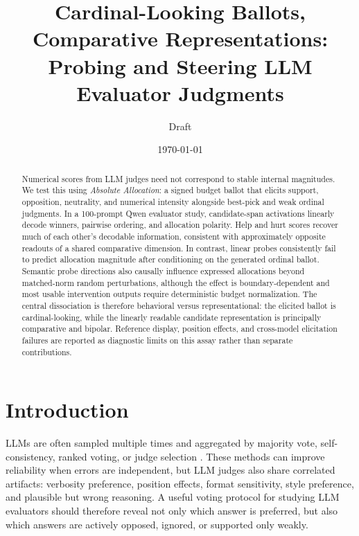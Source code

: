 \documentclass[11pt]{article}
\title{Cardinal-Looking Ballots, Comparative Representations: Probing and Steering LLM Evaluator Judgments}
\author{Draft}
\date{\today}
\begin{document}
\maketitle

\begin{abstract}
Numerical scores from LLM judges need not correspond to stable internal
magnitudes. We test this using \emph{Absolute Allocation}: a signed budget
ballot that elicits support, opposition, neutrality, and numerical intensity
alongside best-pick and weak ordinal judgments. In a 100-prompt Qwen evaluator
study, candidate-span activations linearly decode winners, pairwise ordering,
and allocation polarity. Help and hurt scores recover much of each other's
decodable information, consistent with approximately opposite readouts of a
shared comparative dimension. In contrast, linear probes consistently fail
to predict allocation magnitude after conditioning on the generated ordinal
ballot. Semantic probe directions also causally influence expressed
allocations beyond matched-norm random perturbations, although the effect is
boundary-dependent and most usable intervention outputs require deterministic
budget normalization. The central dissociation is therefore behavioral versus
representational: the elicited ballot is cardinal-looking, while the linearly
readable candidate representation is principally comparative and bipolar.
Reference display, position effects, and cross-model elicitation failures are
reported as diagnostic limits on this assay rather than separate contributions.
\end{abstract}

\section{Introduction}

LLMs are often sampled multiple times and aggregated by majority vote,
self-consistency, ranked voting, or judge selection
\cite{wang2022selfconsistency,wang2025rankedvoting,zheng2023judging}. These
methods can improve reliability when errors are independent, but LLM judges
also share correlated artifacts: verbosity preference, position effects,
format sensitivity, style preference, and plausible but wrong reasoning. A
useful voting protocol for studying LLM evaluators should therefore reveal not
only which answer is preferred, but also which answers are actively opposed,
ignored, or supported only weakly.
\end{document}
